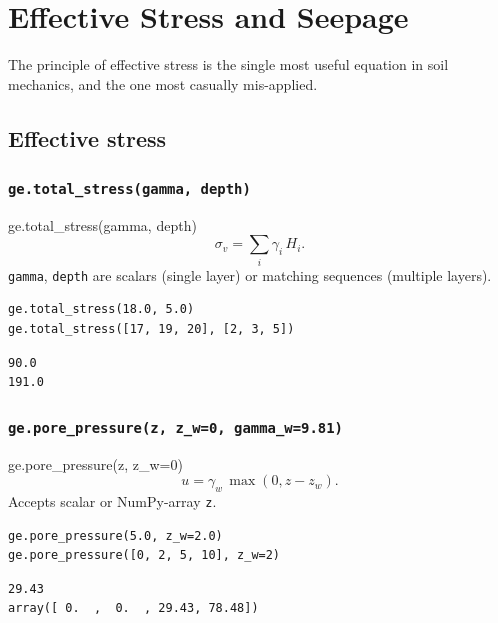 \documentclass[11pt,a4paper,openany]{book}
\newcommand{\sigmav}{\sigma_v}
\newcommand{\gammaw}{\gamma_w}
\begin{document}
\chapter{Effective Stress and Seepage}\label{ch:stress}

\epigraph{The principle of effective stress is the single most
useful equation in soil mechanics, and the one most casually
mis-applied.}{}

\section{Effective stress}

\subsection{\texttt{ge.total\_stress(gamma, depth)}}

\begin{funcbox}{ge.total\_stress(gamma, depth)}
\[
\sigmav = \sum_i \gamma_i\,H_i.
\]
\texttt{gamma}, \texttt{depth} are scalars (single layer) or
matching sequences (multiple layers).
\end{funcbox}

\begin{lstlisting}
ge.total_stress(18.0, 5.0)
ge.total_stress([17, 19, 20], [2, 3, 5])
\end{lstlisting}
\begin{lstlisting}[style=output]
90.0
191.0
\end{lstlisting}

\subsection{\texttt{ge.pore\_pressure(z, z\_w=0, gamma\_w=9.81)}}

\begin{funcbox}{ge.pore\_pressure(z, z\_w=0)}
\[
u = \gammaw\,\max(0, z - z_w).
\]
Accepts scalar or NumPy-array \texttt{z}.
\end{funcbox}

\begin{lstlisting}
ge.pore_pressure(5.0, z_w=2.0)
ge.pore_pressure([0, 2, 5, 10], z_w=2)
\end{lstlisting}
\begin{lstlisting}[style=output]
29.43
array([ 0.  ,  0.  , 29.43, 78.48])
\end{lstlisting}
\end{document}
